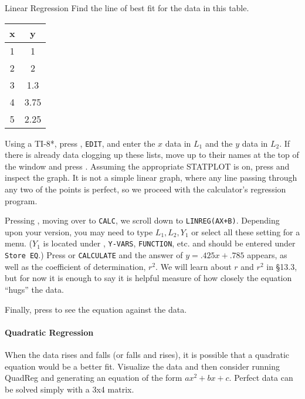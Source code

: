 \begin{example}{Linear Regression}
\exProblem
Find the line of best fit for the data in this table.

\begin{tabular}{c|c}
   \textbf{x} & \textbf{y} \\ \hline 
   1 & 1 \\
   2 & 2 \\
   3 & 1.3 \\
   4 & 3.75 \\
   5 & 2.25 \\
\end{tabular}

\exSolution
Using a TI-8*, press \Touche[style=function,principal=stat], \texttt{EDIT}, and enter the $x$ data in 
$L_1$ and the $y$ data in $L_2$.  If
there is already data clogging up these lists, move up to their names at the top of the window
and press \Touche[style=function,principal=clear]  \Touche[style=enter,principal=enter,raise=-5pt].  Assuming
the appropriate STATPLOT is on, press \Touche[style=graph,principal={zoom},position=0.9,fontsize=7pt]
\Touche[style=number,principal=9] and inspect the graph.  It is not a simple linear graph, where
any line passing through any two of the points is perfect, so we proceed with the calculator's regression
program.

Pressing \Touche[style=function,principal=stat], moving over to \texttt{CALC}, we scroll down to 
\texttt{LINREG(AX+B)}.  Depending upon your version,
you may need to type $L_1, L_2, Y_1$ or select all these setting for a menu.  ($Y_1$ is located under
\Touche[style=function,principal={vars},raise=-5pt], \texttt{Y-VARS}, \texttt{FUNCTION}, etc. and should be 
entered under \texttt{Store EQ}.) Press \Touche[style=enter,principal=enter] or \texttt{CALCULATE}
and the answer of $y=.425x+.785$ appears, as well as the coefficient of determination, $r^2$.  
 We will learn about $r$ and $r^2$ in §13.3, but for now it is enough to say it is helpful
measure of how closely the equation ``hugs'' the data.

Finally, press \Touche[style=graph,principal=graph,position=0.9,fontsize=7pt,raise=-5pt] to see the equation 
against the data.
\end{example}

\paragraph{Quadratic Regression}
When the data rises and falls (or falls and rises), it is possible that a 
quadratic equation would be a better fit.
Visualize the data and then consider running QuadReg and generating an equation of the form $ax^2+bx+c$.
Perfect data can be solved simply with a 3x4 matrix.

